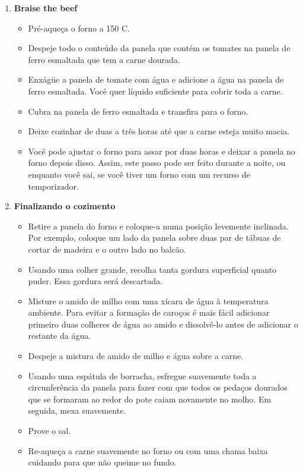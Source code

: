 \documentclass [11pt, letterpaper] {article}
\newcommand \fileName {RustRoast}
\begin{document}
\begin {description}
\begin {enumerate}
\item {\bf Braise the beef}
\begin {itemize}
\item Pré-aqueça o forno a 150 C.
\item Despeje todo o conteúdo da panela que contém os tomates na panela de ferro esmaltada que tem a carne dourada.
\item Enxágüe a panela de tomate com água e adicione a água na panela de ferro esmaltada. Você quer líquido suficiente para cobrir toda a carne.
\item Cubra na panela de ferro esmaltada e transfira para o forno.
\item Deixe cozinhar de duas a três horas até que a carne esteja muito macia.
\item Você pode ajustar o forno para assar por duas horas e deixar a panela no forno depois disso. Assim, este passo pode ser feito durante a noite, ou enquanto você sai, se você tiver um forno com um recurso de temporizador.
\end {itemize}
\item {\bf Finalizando o cozimento}
\begin {itemize}
\item Retire a panela do forno e coloque-a numa posição levemente inclinada. Por exemplo, coloque um lado da panela sobre duas par de tábuas de cortar de madeira e o outro lado no balcão.
\item Usando uma colher grande, recolha tanta gordura superficial quanto puder. Essa gordura será descartada.
\item Misture o amido de milho com uma x\'icara de água à temperatura ambiente. Para evitar a forma\c{c}\~ao de caroços é mais fácil adicionar primeiro duas colheres de água ao amido e dissolvê-lo antes de adicionar o restante da água.
\item Despeje a mistura de amido de milho e água sobre a carne.
\item Usando uma espátula de borracha, esfregue suavemente toda a circunferência da panela para fazer com que todos os pedaços dourados que se formaram ao redor do pote caiam novamente no molho. Em seguida, mexa suavemente.
\item Prove o sal.
\item Re-aqueça a carne suavemente no forno ou com uma chama baixa cuidando para que não queime no fundo.
\end {itemize}
     \end {enumerate}
\end {description}

\end{document}
